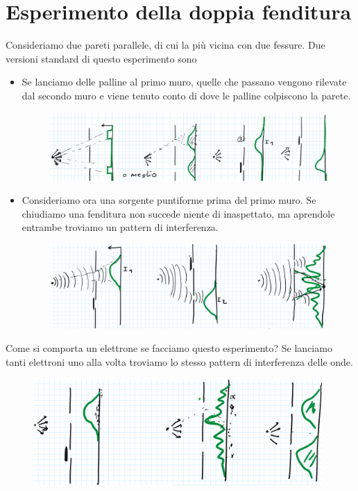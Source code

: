 \section{Esperimento della doppia fenditura}
Consideriamo due pareti parallele, di cui la pi\`u vicina con due fessure. Due versioni standard di questo esperimento sono
\newpage
\begin{itemize}
\item Se lanciamo delle palline al primo muro, quelle che passano vengono rilevate dal secondo muro e viene tenuto conto di dove le palline colpiscono la parete. 

\begin{figure}[!htb]
    \centering
    \includegraphics[width=11cm]{images/Double_slit_palline.png}
\end{figure}

\item Consideriamo ora una sorgente puntiforme prima del primo muro. Se chiudiamo una fenditura non succede niente di inaspettato, ma aprendole entrambe troviamo un pattern di interferenza.

\begin{figure}[!htb]
    \centering
    \includegraphics[width=11cm]{images/double_slit_onda.png}
\end{figure}
\end{itemize}


\noindent
Come si comporta un elettrone se facciamo questo esperimento? Se lanciamo tanti elettroni uno alla volta troviamo lo stesso pattern di interferenza delle onde.

\begin{figure}[!htb]
    \centering
    \includegraphics[width=11cm]{images/double_slit_elettroni.png}
\end{figure}


